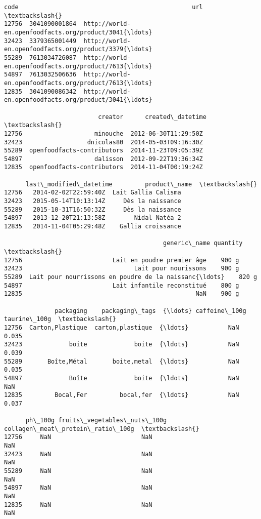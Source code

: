 \documentclass[11pt]{article}
\makeatletter
\newcommand{\boxspacing}{\kern\kvtcb@left@rule\kern\kvtcb@boxsep}
\newcommand{\prompt}[4]{
        \ttfamily\llap{{\color{#2}[#3]:\hspace{3pt}#4}}\vspace{-\baselineskip}
    }
\makeatother
\begin{document}
            \begin{tcolorbox}[breakable, size=fbox, boxrule=.5pt, pad at break*=1mm, opacityfill=0]
\prompt{Out}{outcolor}{18}{\boxspacing}
\begin{Verbatim}[commandchars=\\\{\}]
                code                                                url  \textbackslash{}
12756  3041090001864  http://world-en.openfoodfacts.org/product/3041{\ldots}
32423  3379365001449  http://world-en.openfoodfacts.org/product/3379{\ldots}
55289  7613034726087  http://world-en.openfoodfacts.org/product/7613{\ldots}
54897  7613032506636  http://world-en.openfoodfacts.org/product/7613{\ldots}
12835  3041090086342  http://world-en.openfoodfacts.org/product/3041{\ldots}

                          creator      created\_datetime  \textbackslash{}
12756                    minouche  2012-06-30T11:29:50Z
32423                  dnicolas80  2014-05-03T09:16:30Z
55289  openfoodfacts-contributors  2014-11-23T09:05:39Z
54897                    dalisson  2012-09-22T19:36:34Z
12835  openfoodfacts-contributors  2014-11-04T00:19:24Z

      last\_modified\_datetime         product\_name  \textbackslash{}
12756   2014-02-02T22:59:40Z  Lait Gallia Calisma
32423   2015-05-14T10:13:14Z     Dès la naissance
55289   2015-10-31T16:50:32Z     Dès la naissance
54897   2013-12-20T21:13:58Z        Nidal Natéa 2
12835   2014-11-04T05:29:48Z    Gallia croissance

                                            generic\_name quantity  \textbackslash{}
12756                         Lait en poudre premier âge    900 g
32423                               Lait pour nourissons    900 g
55289  Lait pour nourrissons en poudre de la naissanc{\ldots}    820 g
54897                         Lait infantile reconstitué    800 g
12835                                                NaN    900 g

              packaging    packaging\_tags  {\ldots} caffeine\_100g taurine\_100g  \textbackslash{}
12756  Carton,Plastique  carton,plastique  {\ldots}           NaN        0.035
32423             boite             boite  {\ldots}           NaN        0.039
55289       Boîte,Métal       boite,metal  {\ldots}           NaN        0.035
54897             Boîte             boite  {\ldots}           NaN          NaN
12835         Bocal,Fer         bocal,fer  {\ldots}           NaN        0.037

      ph\_100g fruits\_vegetables\_nuts\_100g collagen\_meat\_protein\_ratio\_100g  \textbackslash{}
12756     NaN                         NaN                              NaN
32423     NaN                         NaN                              NaN
55289     NaN                         NaN                              NaN
54897     NaN                         NaN                              NaN
12835     NaN                         NaN                              NaN


\end{Verbatim}
\end{tcolorbox}
\end{document}
